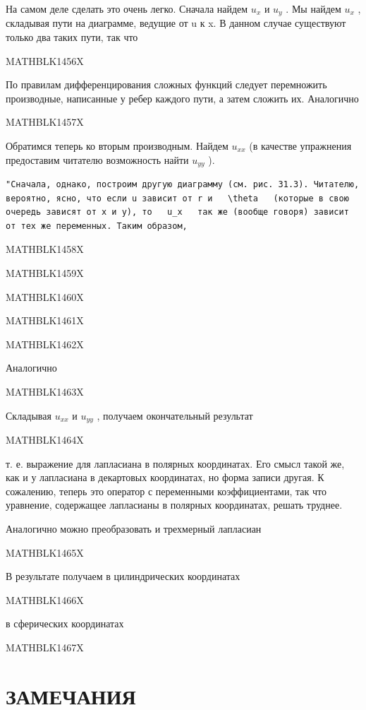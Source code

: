 \documentclass[
]{article}
\begin{document}
{{{На самом деле сделать это очень легко. Сначала найдем \(u_x\) и \(u_y\)
. Мы найдем \(u_x\) , складывая пути на диаграмме, ведущие от u к x. В
данном случае существуют только два таких пути, так что

MATHBLK1456X

По правилам дифференцирования сложных функций следует перемножить
производные, написанные у ребер каждого пути, а затем сложить их.
Аналогично

MATHBLK1457X

Обратимся теперь ко вторым производным. Найдем \(u_{xx}\) (в качестве
упражнения предоставим читателю возможность найти \(u_{yy}\) ).

\begin{verbatim}
"Сначала, однако, построим другую диаграмму (см. рис. 31.3). Читателю, вероятно, ясно, что если u зависит от r и   \theta   (которые в свою очередь зависят от x и y), то   u_x   так же (вообще говоря) зависит от тех же переменных. Таким образом,
\end{verbatim}

MATHBLK1458X

MATHBLK1459X

MATHBLK1460X

MATHBLK1461X

MATHBLK1462X

Аналогично

MATHBLK1463X

Складывая \(u_{xx}\) и \(u_{yy}\) , получаем окончательный результат

MATHBLK1464X

т. е. выражение для лапласиана в полярных координатах. Его смысл такой
же, как и у лапласиана в декартовых координатах, но форма записи другая.
К сожалению, теперь это оператор с переменными коэффициентами, так что
уравнение, содержащее лапласианы в полярных координатах, решать труднее.

Аналогично можно преобразовать и трехмерный лапласиан

MATHBLK1465X

В результате получаем в цилиндрических координатах

MATHBLK1466X

в сферических координатах

MATHBLK1467X

\section{ЗАМЕЧАНИЯ}\label{ux437ux430ux43cux435ux447ux430ux43dux438ux44f-12}

}}}
\end{document}
